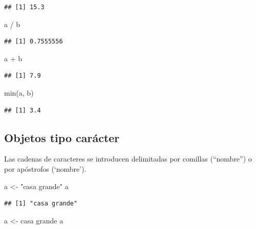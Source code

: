 \documentclass[
]{book}
\newenvironment{Shaded}{\begin{snugshade}}{\end{snugshade}}
\newcommand{\FunctionTok}[1]{\textcolor[rgb]{0.00,0.00,0.00}{#1}}
\newcommand{\NormalTok}[1]{#1}
\newcommand{\OtherTok}[1]{\textcolor[rgb]{0.56,0.35,0.01}{#1}}
\newcommand{\SpecialCharTok}[1]{\textcolor[rgb]{0.00,0.00,0.00}{#1}}
\newcommand{\StringTok}[1]{\textcolor[rgb]{0.31,0.60,0.02}{#1}}
\theoremstyle{break}
\theoremstyle{nonumberplain}
\begin{document}
\begin{verbatim}
## [1] 15.3
\end{verbatim}

\begin{Shaded}
\begin{Highlighting}[]
\NormalTok{a }\SpecialCharTok{/}\NormalTok{ b}
\end{Highlighting}
\end{Shaded}

\begin{verbatim}
## [1] 0.7555556
\end{verbatim}

\begin{Shaded}
\begin{Highlighting}[]
\NormalTok{a }\SpecialCharTok{+}\NormalTok{ b}
\end{Highlighting}
\end{Shaded}

\begin{verbatim}
## [1] 7.9
\end{verbatim}

\begin{Shaded}
\begin{Highlighting}[]
\FunctionTok{min}\NormalTok{(a, b)}
\end{Highlighting}
\end{Shaded}

\begin{verbatim}
## [1] 3.4
\end{verbatim}

\hypertarget{objetos-tipo-caruxe1cter}{%
\subsection{Objetos tipo carácter}\label{objetos-tipo-caruxe1cter}}

Las cadenas de caracteres
se introducen delimitadas por comillas (``nombre'') o por apóstrofos
(`nombre').

\begin{Shaded}
\begin{Highlighting}[]
\NormalTok{a }\OtherTok{\textless{}{-}} \StringTok{"casa grande"}
\NormalTok{a}
\end{Highlighting}
\end{Shaded}

\begin{verbatim}
## [1] "casa grande"
\end{verbatim}

\begin{Shaded}
\begin{Highlighting}[]
\NormalTok{a }\OtherTok{\textless{}{-}} \StringTok{\textquotesingle{}casa grande\textquotesingle{}}
\NormalTok{a}
\end{Highlighting}
\end{Shaded}
\end{document}
